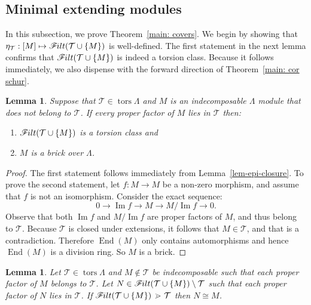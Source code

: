 \documentclass[10pt]{amsart}
\providecommand{\1}{}
\DeclareMathOperator{\tors}{tors}
\DeclareMathOperator{\image}{Im}
\DeclareMathOperator{\End}{End}
\newcommand{\calT}{\mathcal{T}}
\newcommand{\filt}{\mathscr{F}\Mk ilt}
\newcommand{\covers}{{\,\,\,\cdot\!\!\!\! >\,\,}}
\renewcommand{\1}{\hat{1}}
\newcommand{\0}{\hat{0}}
\newcommand*{\Mk}{\mkern -2mu}
\newtheorem{lemma}[theorem]{Lemma}
\theoremstyle{definition}
\begin{document}
\subsection{Minimal extending modules}\label{proof sec}
In this subsection, we prove Theorem~\ref{main: covers}.
We begin by showing that $\eta_\calT: [M]\mapsto \filt(\calT \cup \{M\})$ is well-defined.
The first statement in the next lemma confirms that $\filt(\calT \cup \{M\})$ is indeed a torsion class.
Because it follows immediately, we also dispense with the forward direction of Theorem~\ref{main: cor schur}.
\begin{lemma}\label{lem: torsion and schur}
Suppose that $\calT\in \tors \Lambda$ and $M$ is an indecomposable $\Lambda$ module that does not belong to $\calT$.
If every proper factor of $M$ lies in $\calT$ then:
\begin{enumerate}
\item $\filt(\calT \cup \{M\})$ is a torsion class and
\item $M$ is a brick over $\Lambda$.
\end{enumerate}
\end{lemma}
\begin{proof}
The first statement follows immediately from Lemma~\ref{lem-epi-closure}.
To prove the second statement, let $f:M\rightarrow M$ be a non-zero morphism, and assume that $f$ is not an isomorphism.
Consider the exact sequence:
$$
0\rightarrow \image f\rightarrow M\rightarrow M/\image f\rightarrow 0.
$$
Observe that both $\image f$ and $M/\image f$ are proper factors of $M$, and thus belong to $\calT$.
Because $\calT$ is closed under extensions, it follows that $M\in\calT$, and that is a contradiction.
Therefore $\End(M)$ only contains automorphisms
and hence $\End(M)$ is a division ring. So $M$ is a brick.
\end{proof}
\begin{lemma}\label{uniqueness}
Let $\calT\in \tors\Lambda$ and $M\not\in \calT$ be indecomposable such that each proper factor of $M$ belongs to $\calT$.
Let $N\in \filt(\calT \cup \{M\})\setminus \calT$ such that each proper factor of $N$ lies in $\calT$.
If $\filt(\calT \cup \{M\})\covers \calT$ then $N\cong M$.
 
\end{lemma}
\end{document}
